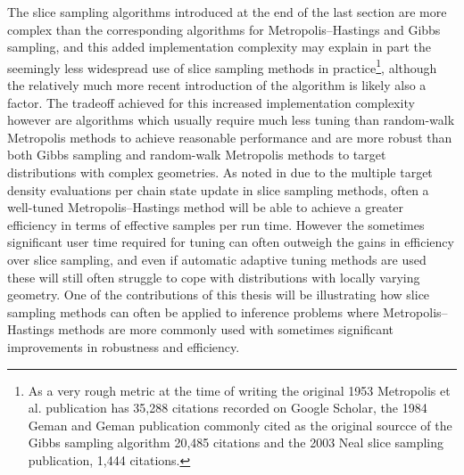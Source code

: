 The slice sampling algorithms introduced at the end of the last section are more complex than the corresponding algorithms for Metropolis--Hastings and Gibbs sampling, and this added implementation complexity may explain in part the seemingly less widespread use of slice samp\-ling methods in practice\footnote{As a very rough metric at the time of writing the original 1953 Metropolis et al. publication \citep{metropolis1953equation} has 35,288 citations recorded on Google Scholar, the 1984 Geman and Geman publication \citep{geman1984stochastic} commonly cited as the original sourcce of the Gibbs sampling algorithm 20,485 citations and the 2003 Neal \citep{neal2003slice} slice sampling publication, 1,444 citations.}, although the relatively much more recent introduction of the algorithm is likely also a factor. The tradeoff achieved for this increased implementation complexity however are algorithms which usually require much less tuning than random-walk Metropolis methods to achieve reasonable performance and are more robust than both Gibbs sampling and random-walk Metropolis methods to target distributions with complex geometries. As noted in \citep{murray2010elliptical} due to the multiple target density evaluations per chain state update in slice sampling methods, often a well-tuned Metropolis--Hastings method will be able to achieve a greater efficiency in terms of effective samples per run time. However the sometimes significant user time required for tuning can often outweigh the gains in efficiency over slice sampling, and even if automatic adaptive tuning methods are used these will still often struggle to cope with distributions with locally varying geometry. One of the contributions of this thesis will be illustrating how slice sampling methods can often be applied to inference problems where Metropolis--Hastings methods are more commonly used with sometimes significant improvements in robustness and efficiency.








